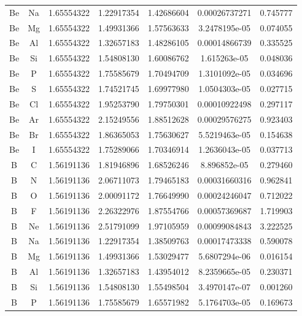 \begin{longtable}{@{}ccccccc@{}}
Be &  Na    &     1.65554322   &   1.22917354  &    1.42686604 &  0.00026737271  &  0.745777\\
Be &  Mg    &     1.65554322   &   1.49931366  &    1.57563633 &  3.2478195e-05  &  0.074055\\
Be &  Al    &     1.65554322   &   1.32657183  &    1.48286105 &  0.00014866739  &  0.335525\\
Be &  Si    &     1.65554322   &   1.54808130  &    1.60086762 &   1.615263e-05  &  0.048036\\
Be &  P     &     1.65554322   &   1.75585679  &    1.70494709 &  1.3101092e-05  &  0.034696\\
Be &  S     &     1.65554322   &   1.74521745  &    1.69977980 &  1.0504303e-05  &  0.027715\\
Be &  Cl    &     1.65554322   &   1.95253790  &    1.79750301 &  0.00010922498  &  0.297117\\
Be &  Ar    &     1.65554322   &   2.15249556  &    1.88512628 &  0.00029576275  &  0.923403\\
Be &  Br    &     1.65554322   &   1.86365053  &    1.75630627 &  5.5219463e-05  &  0.154638\\
Be &  I     &     1.65554322   &   1.75289066  &    1.70346914 &  1.2636043e-05  &  0.037713\\
B  &  C     &     1.56191136   &   1.81946896  &    1.68526246 &   8.896852e-05  &  0.279460\\
B  &  N     &     1.56191136   &   2.06711073  &    1.79465183 &  0.00031660316  &  0.962841\\
B  &  O     &     1.56191136   &   2.00091172  &    1.76649990 &  0.00024246047  &  0.712022\\
B  &  F     &     1.56191136   &   2.26322976  &    1.87554766 &  0.00057369687  &  1.719903\\
B  &  Ne    &     1.56191136   &   2.51791099  &    1.97105959 &  0.00099084843  &  3.222525\\
B  &  Na    &     1.56191136   &   1.22917354  &    1.38509763 &  0.00017473338  &  0.590078\\
B  &  Mg    &     1.56191136   &   1.49931366  &    1.53029477 &  5.6807294e-06  &  0.016154\\
B  &  Al    &     1.56191136   &   1.32657183  &    1.43954012 &  8.2359665e-05  &  0.230371\\
B  &  Si    &     1.56191136   &   1.54808130  &    1.55498504 &  3.4970147e-07  &  0.001260\\
B  &  P     &     1.56191136   &   1.75585679  &    1.65571982 &  5.1764703e-05  &  0.169673\\

\end{longtable}
